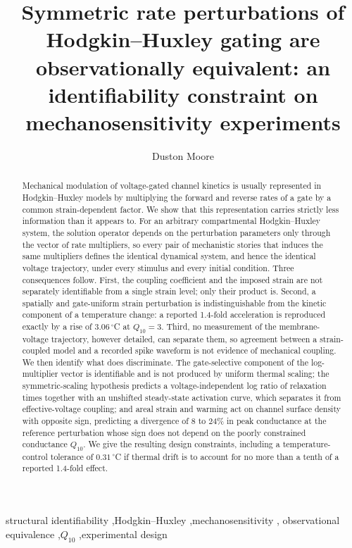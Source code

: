 \begin{frontmatter}

\title{Symmetric rate perturbations of Hodgkin--Huxley gating are
observationally equivalent: an identifiability constraint on
mechanosensitivity experiments}

\author{Duston Moore}
\address{Independent Researcher, Edmonton, Alberta, Canada}

\begin{abstract}
Mechanical modulation of voltage-gated channel kinetics is usually represented
in Hodgkin--Huxley models by multiplying the forward and reverse rates of a gate
by a common strain-dependent factor. We show that this representation carries
strictly less information than it appears to. For an arbitrary compartmental
Hodgkin--Huxley system, the solution operator depends on the perturbation
parameters only through the vector of rate multipliers, so every pair of
mechanistic stories that induces the same multipliers defines the identical
dynamical system, and hence the identical voltage trajectory, under every
stimulus and every initial condition. Three
consequences follow. First, the coupling coefficient and the imposed strain are
not separately identifiable from a single strain level; only their product is.
Second, a spatially and gate-uniform strain perturbation is indistinguishable
from the kinetic component of a temperature change: a reported 1.4-fold
acceleration is reproduced exactly by a rise of $3.06\,^{\circ}$C at
$Q_{10}=3$. Third, no measurement of the membrane-voltage trajectory, however
detailed, can separate them, so agreement between a strain-coupled model and a
recorded spike waveform is not evidence of mechanical coupling. We then identify
what does discriminate. The gate-selective component of the log-multiplier
vector is identifiable and is not produced by uniform thermal scaling; the
symmetric-scaling hypothesis predicts a voltage-independent log ratio of
relaxation times together with an unshifted steady-state activation curve,
which separates it from effective-voltage coupling; and areal strain and warming
act on channel surface density with opposite sign, predicting a divergence of
$8$ to $24\%$ in peak conductance at the reference perturbation whose sign does
not depend on the poorly constrained conductance $Q_{10}$. We give the
resulting design constraints, including a temperature-control tolerance of
$0.31\,^{\circ}$C if thermal drift is to account for no more than a tenth of a
reported 1.4-fold effect.
\end{abstract}

\begin{keyword}
structural identifiability \sep Hodgkin--Huxley \sep mechanosensitivity \sep
observational equivalence \sep $Q_{10}$ \sep experimental design
\end{keyword}

\end{frontmatter}


